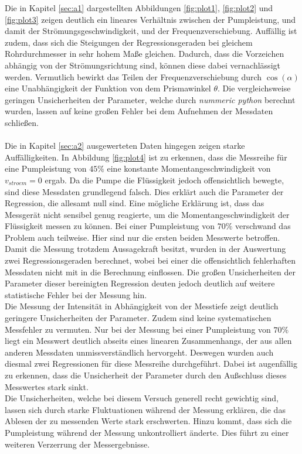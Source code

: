Die in Kapitel \ref{sec:a1} dargestellten Abbildungen \ref{fig:plot1}, \ref{fig:plot2} und \ref{fig:plot3} zeigen deutlich ein lineares Verhältnis
zwischen der Pumpleistung, und damit der Strömungsgeschwindigkeit, und der Frequenzverschiebung. Auffällig ist zudem, dass sich die Steigungen der 
Regressionsgeraden bei gleichem Rohrdurchmesser in sehr hohem Maße gleichen. Dadurch, dass die Vorzeichen abhängig von der Strömungsrichtung sind,
können diese dabei vernachlässigt werden. Vermutlich bewirkt das Teilen der Frequenzverschiebung durch $\cos(\alpha)$ eine Unabhängigkeit der 
Funktion von dem Prismawinkel $\theta$. Die vergleichsweise geringen Unsicherheiten der Parameter, welche durch \textit{nummeric python} \cite{numpy}
berechnt wurden, lassen auf keine großen Fehler bei dem Aufnehmen der Messdaten schließen. 
\\\\\noindent
Die in Kapitel \ref{sec:a2} ausgewerteten Daten hingegen zeigen starke Auffälligkeiten. In Abbildung \ref{fig:plot4} ist zu erkennen, dass die 
Messreihe für eine Pumpleistung von $45\%$ eine konstante Momentangeschwindigkeit von $v_{stroem}=0$ ergab. Da die Pumpe die Flüssigkeit jedoch
offensichtlich bewegte, sind diese Messdaten grundlegend falsch. Dies erklärt auch die Parameter der Regression, die allesamt null sind. Eine 
mögliche Erklärung ist, dass das Messgerät nicht sensibel genug reagierte, um die Momentangeschwindigkeit der Flüssigkeit messen zu können. 
Bei einer Pumpleistung von $70\%$ verschwand das Problem auch teilweise. Hier sind nur die ersten beiden Messwerte betroffen. Damit die 
Messung trotzdem Aussagekraft besitzt, wurden in der Auswertung zwei Regressionsgeraden berechnet, wobei bei einer die offensichtlich fehlerhaften
Messdaten nicht mit in die Berechnung einflossen. Die großen Unsicherheiten der Parameter dieser bereinigten Regression deuten jedoch deutlich auf
weitere statistische Fehler bei der Messung hin.
\\\noindent
Die Messung der Intensität in Abhängigkeit von der Messtiefe zeigt deutlich geringere Unsicherheiten der Parameter. Zudem sind keine systematischen
Messfehler zu vermuten. Nur bei der Messung bei einer Pumpleistung von $70\%$ liegt ein Messwert deutlich abseits eines linearen Zusammenhangs, der 
aus allen anderen Messdaten unmissverständlich hervorgeht. Deswegen wurden auch diesmal zwei Regressionen für diese Messreihe durchgeführt. Dabei 
ist augenfällig zu erkennen, dass die Unsicherheit der Parameter durch den Außschluss dieses Messwertes stark sinkt.
\\\noindent
Die Unsicherheiten, welche bei diesem Versuch generell recht gewichtig sind, lassen sich durch starke Fluktuationen während der Messung erklären,
die das Ablesen der zu messenden Werte stark erschwerten. Hinzu kommt, dass sich die Pumpleistung während der Messung unkontrolliert änderte. Dies
führt zu einer weiteren Verzerrung der Messergebnisse.